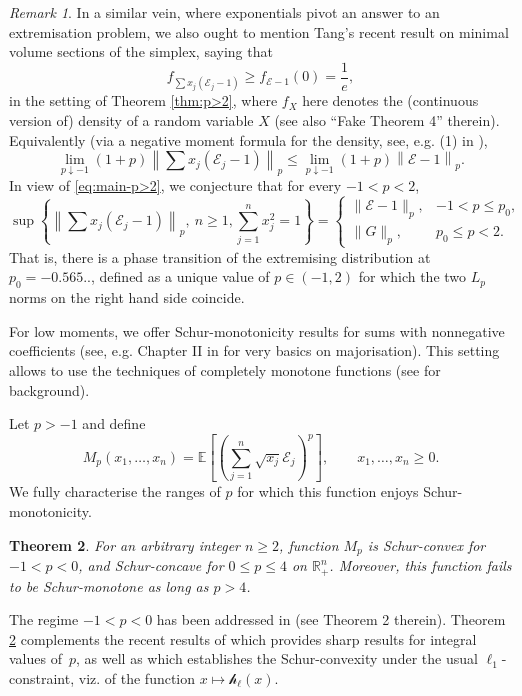 \documentclass[10pt]{article}
\newcommand{\E}{\mathbb{E}}
\newcommand{\1}{\textbf{1}}
\newcommand{\R}{\mathbb{R}}
\newcommand{\cE}{\mathscr{E}}
\newcommand{\hh}{\mathscr{h}}
\newtheorem{theorem}{Theorem}
\theoremstyle{remark}
\newtheorem{remark}[theorem]{Remark}
\theoremstyle{definition}
\begin{document}
\begin{remark}\label{rem:neg-mom}
In a similar vein, where exponentials pivot an answer to an extremisation problem, we also ought to mention Tang's recent result \cite{T} on minimal volume sections of the simplex, saying that 
\[
f_{\sum x_j(\cE_j-1)} \geq f_{\cE-1}(0) = \frac{1}{e},
\]
in the setting of Theorem \ref{thm:p>2}, where $f_X$ here denotes the (continuous version of) density of a random variable $X$ (see also ``Fake Theorem 4'' therein). Equivalently (via a negative moment formula for the density, see, e.g. (1) in \cite{CNT}), 
\[
\lim_{p\downarrow -1} (1+p)\left\|\sum x_j(\cE_j-1)\right\|_p \leq \lim_{p\downarrow -1} (1+p)\left\|\cE-1\right\|_p.
 \]
In view of \eqref{eq:main-p>2}, we conjecture that for every $-1 < p < 2$,
\[ 
\sup\left\{\left\|\sum x_j(\cE_j-1)\right\|_p, \ n \geq 1, \sum_{j=1}^n x_j^2 = 1\right\} = \begin{cases} \|\cE-1\|_p, & -1 < p \leq p_0, \\ \|G\|_p, & p_0 \leq p < 2. \end{cases}
 \]
That is, there is a phase transition of the extremising distribution at $p_0 = -0.565..$, defined as a unique value of $p \in (-1, 2)$ for which the two $L_p$ norms on the right hand side coincide. 
\end{remark}


For low moments, we offer Schur-monotonicity results for sums with nonnegative coefficients (see, e.g. Chapter II in \cite{Bh} for very basics on majorisation). This setting allows to use the techniques of completely monotone functions (see \cite{Wid} for background).

Let $p > -1$ and define
\begin{equation}\label{eq:def-Mp}
M_p(x_1, \dots, x_n) = \E \left[\left(\sum_{j=1}^n \sqrt{x_j}\cE_j\right)^p\right], \qquad x_1, \dots, x_n \geq 0.
\end{equation}
We fully characterise the ranges of $p$ for which this function enjoys Schur-monotonicity.

\begin{theorem}\label{thm:Schur}
For an arbitrary integer $n \geq 2$, function $M_p$ is Schur-convex for $-1 < p < 0$, and Schur-concave for $0 \leq p \leq 4$ on $\R_+^n$. Moreover, this function fails to be Schur-monotone as long as $p > 4$.
\end{theorem}

The regime $-1 < p < 0$ has been addressed in \cite{CST0} (see Theorem 2 therein). Theorem \ref{thm:Schur} complements the recent results of \cite{BP} which provides sharp results for integral values of~$p$, as well as \cite{Tao-blog} which establishes the Schur-convexity under the usual $\ell_1$-constraint, viz. of the function $x \mapsto \hh_\ell(x)$.
\end{document}
